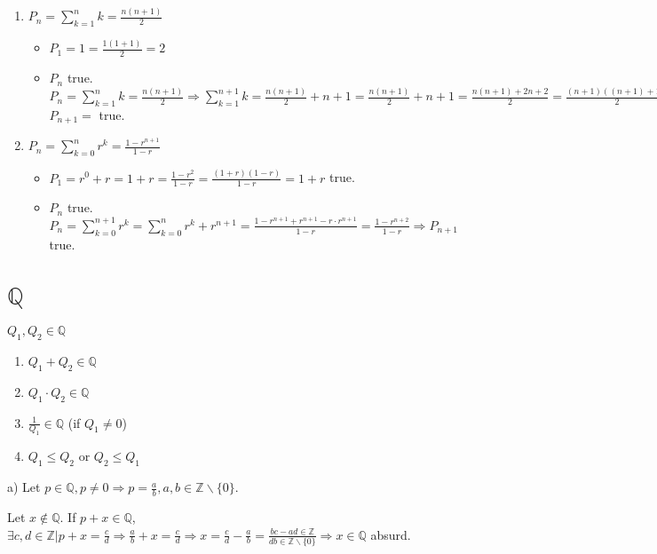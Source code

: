 \documentclass[12pt, a4paper]{book}
\begin{document}
\begin{exmp}
  \begin{enumerate}[label=\emph{\alph*})]
    \item $\displaystyle P_n = \sum_{k = 1}^{n}k = \frac{n(n+1)}{2}$
    \begin{itemize}
      \item $\displaystyle P_1 = 1 = \frac{1(1+1)}{2} = 2$
      \item $P_n$ true. $\displaystyle P_n = \sum_{k = 1}^{n}k = \frac{n(n+1)}{2} \Rightarrow \sum_{k = 1}^{n+1}k = \frac{n(n+1)}{2} + n+1 = \frac{n(n+1)}{2} + n+1 = \frac{n(n+1)+2n+2}{2} = \frac{(n+1)((n+1)+1)}{2} \Rightarrow \sum_{k = 1}^{n+1}k = \frac{(n+1)((n+1)+1)}{2}$ $P_{n+1} =$ true.
    \end{itemize}
    \item $\displaystyle P_n = \sum_{k = 0}^{n}r^k = \frac{1-r^{n+1}}{1-r}$
    \begin{itemize}
      \item $\displaystyle P_1 = r^0 + r = 1+r = \frac{1-r^2}{1-r} = \frac{(1+r)(1-r)}{1-r} = 1+r$ true.
      \item $P_n$ true. $\displaystyle P_n = \sum_{k = 0}^{n+1}r^k = \sum_{k = 0}^{n}r^k + r^{n+1} = \frac{1-r^{n+1}+r^{n+1}-r\cdot r^{n+1}}{1-r} = \frac{1-r^{n+2}}{1-r} \Rightarrow P_{n+1}$ true.
    \end{itemize}
  \end{enumerate}
\end{exmp}


\section{$\mathbb{Q}$}

\begin{proposition}
  $Q_1,Q_2 \in \mathbb{Q}$
  \begin{enumerate}[label=\emph{\alph*})]
    \item $Q_1 + Q_2 \in \mathbb{Q}$
    \item $Q_1 \cdot Q_2 \in \mathbb{Q}$
    \item $\displaystyle \frac{1}{Q_1} \in \mathbb{Q}$ (if $Q_1 \neq 0$)
    \item $Q_1 \leq Q_2$ or $Q_2 \leq Q_1$
  \end{enumerate}
\end{proposition}

\begin{exmp}
  a) Let $\displaystyle p \in \mathbb{Q}, p\neq 0 \Rightarrow p = \frac{a}{b}, a,b \in \mathbb{Z}\backslash \{0\}$.

  Let $\displaystyle x \notin \mathbb{Q}$. If $p+x \in \mathbb{Q}$, $\exists c,d \in \mathbb{Z} \vert p+x = \frac{c}{d} \Rightarrow \frac{a}{b} + x = \frac{c}{d} \Rightarrow x = \frac{c}{d} - \frac{a}{b} = \frac{bc-ad\in \mathbb{Z}}{db \in \mathbb{Z}\backslash \{0\}} \Rightarrow x \in \mathbb{Q}$ absurd.
\end{exmp}
\end{document}
